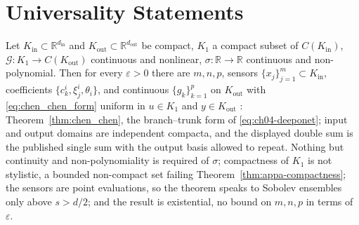 \section{Universality Statements}\label{sec:appa-universality}

\begin{theorem}\label{thm:appa-chen-chen}
Let $K_{\mathrm{in}} \subset \mathbb{R}^{d_{\mathrm{in}}}$ and $K_{\mathrm{out}} \subset
\mathbb{R}^{d_{\mathrm{out}}}$ be compact, $K_1$ a compact subset of $C(K_{\mathrm{in}})$,
$\mathcal{G} : K_1 \to C(K_{\mathrm{out}})$ continuous and nonlinear,
$\sigma : \mathbb{R} \to \mathbb{R}$ continuous and non-polynomial. Then for every
$\varepsilon > 0$ there are $m, n, p$, sensors $\{x_j\}_{j=1}^m \subset K_{\mathrm{in}}$, coefficients
$\{c_k^i, \xi_j^i, \theta_i\}$, and continuous $\{g_k\}_{k=1}^p$ on $K_{\mathrm{out}}$ with
\eqref{eq:chen_chen_form} uniform in $u \in K_1$ and $y \in K_{\mathrm{out}}$ \cite{chen1995universal}:
Theorem~\ref{thm:chen_chen},
the branch--trunk form of \eqref{eq:ch04-deeponet}; input and output domains are independent
compacta, and the displayed double sum is the published single sum with the output basis
allowed to repeat. Nothing but continuity and
non-polynomiality is required of $\sigma$; compactness of $K_1$ is not stylistic, a bounded
non-compact set failing Theorem~\ref{thm:appa-compactness}; the sensors are point
evaluations, so the theorem speaks to Sobolev ensembles only above $s > d/2$;
and the result is existential, no
bound on $m, n, p$ in terms of $\varepsilon$.
\end{theorem}

